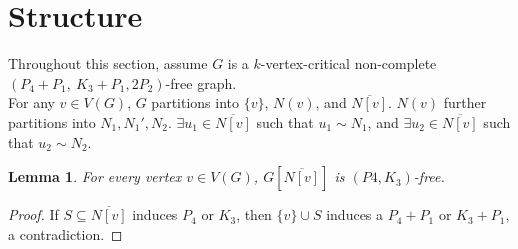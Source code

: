 \documentclass[11pt]{article}
\newtheorem{lemma}[theorem]{Lemma}
\theoremstyle{definition}
\newcommand{\forbid}{$(P_4+P_1,\ K_3+P_1,2P_2)$}
\newcommand{\noneighbs}{\overline{N[v]}}
\begin{document}
\begin{abstract}
\end{abstract}

\section{Structure}

Throughout this section, assume $G$ is a $k$-vertex-critical non-complete \forbid -free graph.\\

For any $v\in V(G)$, $G$ partitions into $\{v\}$, $N(v)$, and $\overline{N[v]}$. $N(v)$ further partitions into $N_1, N_1', N_2$. $\exists u_1 \in \noneighbs$ such that $u_1 \sim N_1$, and $\exists u_2 \in \noneighbs$ such that $u_2 \sim N_2$.


\begin{lemma}\label{lem:P4K3-free}
For every vertex $v\in V(G)$,  $G[\noneighbs]$ is $(P4, K_3)$-free.
\end{lemma}
\begin{proof}
If $S\subseteq\noneighbs$ induces $P_4$ or $K_3$, then $\{v\}\cup S$ induces a $P_4+P_1$ or $K_3+P_1$, a contradiction.
\end{proof}
\end{document}
